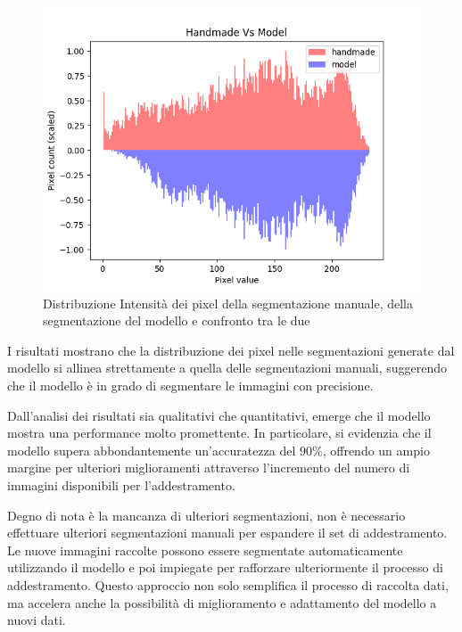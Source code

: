 \begin{figure}[!ht]
\begin{minipage}{0.32\textwidth}
		\includegraphics[width=\columnwidth]{Immagini/handmade_vs_model_scaled.png}
	\end{minipage}
	\caption{Distribuzione Intensità dei pixel della segmentazione manuale, della segmentazione del modello e confronto tra le due}
	\label{fig:distribuzione intensità dei pixel della segmentazione manuale, della segmentazione del modello e confronto tra le due}
\end{figure}


I risultati mostrano che la distribuzione dei pixel nelle segmentazioni generate dal modello si
allinea strettamente a quella delle segmentazioni manuali, suggerendo che il modello è in grado di
segmentare le immagini con precisione.


Dall'analisi dei risultati sia qualitativi che quantitativi, emerge che il modello mostra una
performance molto promettente. In particolare, si evidenzia che il modello supera abbondantemente
un'accuratezza del $90\%$, offrendo un ampio margine per ulteriori miglioramenti attraverso
l'incremento del numero di immagini disponibili per l'addestramento.

Degno di nota è la mancanza di ulteriori segmentazioni, non è necessario effettuare ulteriori
segmentazioni manuali per espandere il set di addestramento. Le nuove immagini raccolte possono
essere segmentate automaticamente utilizzando il modello e poi impiegate per rafforzare
ulteriormente il processo di addestramento. Questo approccio non solo semplifica il processo di
raccolta dati, ma accelera anche la possibilità di miglioramento e adattamento del modello a nuovi
dati.


